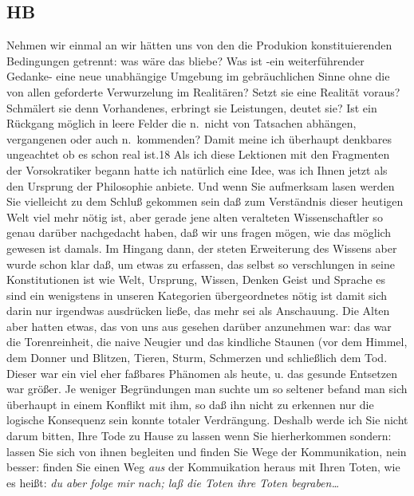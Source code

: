 \documentclass[
]{article}
\author{}
\date{\vspace{-2.5em}}
\begin{document}
\subsection{HB}\label{hb}

Nehmen wir einmal an wir hätten uns von den die Produkion
konstituierenden Bedingungen getrennt: was wäre das bliebe? Was ist -ein
weiterführender Gedanke- eine neue unabhängige Umgebung im
gebräuchlichen Sinne ohne die von allen geforderte Verwurzelung im
Realitären? Setzt sie eine Realität voraus? Schmälert sie denn
Vorhandenes, erbringt sie Leistungen, deutet sie? Ist ein Rückgang
möglich in leere Felder die n.~nicht von Tatsachen abhängen, vergangenen
oder auch n.~kommenden? Damit meine ich überhaupt denkbares ungeachtet
ob es schon real ist.18 Als ich diese Lektionen mit den Fragmenten der
Vorsokratiker begann hatte ich natürlich eine Idee, was ich Ihnen jetzt
als den Ursprung der Philosophie anbiete. Und wenn Sie aufmerksam lasen
werden Sie vielleicht zu dem Schluß gekommen sein daß zum Verständnis
dieser heutigen Welt viel mehr nötig ist, aber gerade jene alten
veralteten Wissenschaftler so genau darüber nachgedacht haben, daß wir
uns fragen mögen, wie das möglich gewesen ist damals. Im Hingang dann,
der steten Erweiterung des Wissens aber wurde schon klar daß, um etwas
zu erfassen, das selbst so verschlungen in seine Konstitutionen ist wie
Welt, Ursprung, Wissen, Denken Geist und Sprache es sind ein wenigstens
in unseren Kategorien übergeordnetes nötig ist damit sich darin nur
irgendwas ausdrücken ließe, das mehr sei als Anschauung. Die Alten aber
hatten etwas, das von uns aus gesehen darüber anzunehmen war: das war
die Torenreinheit, die naive Neugier und das kindliche Staunen (vor dem
Himmel, dem Donner und Blitzen, Tieren, Sturm, Schmerzen und schließlich
dem Tod. Dieser war ein viel eher faßbares Phänomen als heute, u. das
gesunde Entsetzen war größer. Je weniger Begründungen man suchte um so
seltener befand man sich überhaupt in einem Konflikt mit ihm, so daß ihn
nicht zu erkennen nur die logische Konsequenz sein konnte totaler
Verdrängung. Deshalb werde ich Sie nicht darum bitten, Ihre Tode zu
Hause zu lassen wenn Sie hierherkommen sondern: lassen Sie sich von
ihnen begleiten und finden Sie Wege der Kommunikation, nein besser:
finden Sie einen Weg \emph{aus} der Kommuikation heraus mit Ihren Toten,
wie es heißt: \emph{du aber folge mir nach; laß die Toten ihre Toten
begraben\ldots{}}
\end{document}
